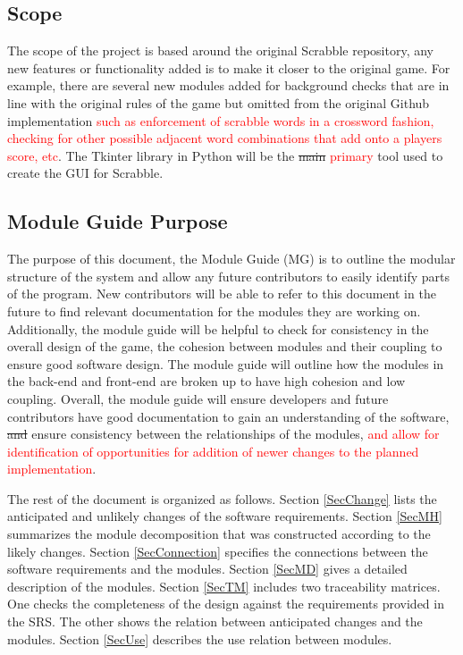 \documentclass[12pt, titlepage]{article}
\begin{document}
\subsection{Scope}

The scope of the project is based around the original Scrabble repository, any new features or functionality added is to make it closer to the original game. For example, there are several new modules added for background checks that are in line with the original rules of the game but omitted from the original Github implementation \textcolor{red}{such as enforcement of scrabble words in a crossword fashion, checking for other possible adjacent word combinations that add onto a players score, etc}. The Tkinter library in Python will be the \sout{main} \textcolor{red}{primary} tool used to create the GUI for Scrabble.

\subsection{Module Guide Purpose}
The purpose of this document, the Module Guide (MG) is to outline the modular structure of the system and allow any future contributors to easily identify parts of the program. New contributors will be able to refer to this document in the future to find relevant documentation for the modules they are working on. Additionally, the module guide will be helpful to check for consistency in the overall design of the game, the cohesion between modules and their coupling to ensure good software design. The module guide will outline how the modules in the back-end and front-end are broken up to have high cohesion and low coupling. Overall, the module guide will ensure developers and future contributors have good documentation to gain an understanding of the software, \sout{and} ensure consistency between the relationships of the modules, \textcolor{red}{and allow for identification of opportunities for addition of newer changes to the planned implementation}.

The rest of the document is organized as follows. Section
\ref{SecChange} lists the anticipated and unlikely changes of the software
requirements. Section \ref{SecMH} summarizes the module decomposition that
was constructed according to the likely changes. Section \ref{SecConnection}
specifies the connections between the software requirements and the
modules. Section \ref{SecMD} gives a detailed description of the
modules. Section \ref{SecTM} includes two traceability matrices. One checks
the completeness of the design against the requirements provided in the SRS. The
other shows the relation between anticipated changes and the modules. Section
\ref{SecUse} describes the use relation between modules.
\end{document}
